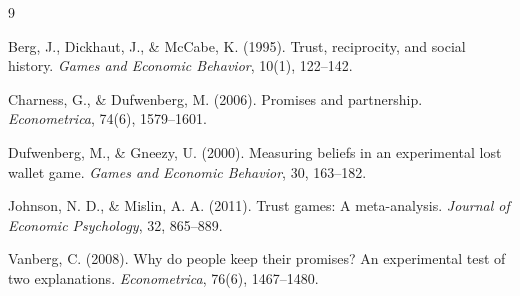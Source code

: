 \documentclass[10pt,a4paper]{ctexart}
\begin{document}
\begin{thebibliography}{9}\footnotesize
\setlength{\itemsep}{0pt}

Berg, J., Dickhaut, J., \& McCabe, K. (1995). Trust, reciprocity, and social history.
\textit{Games and Economic Behavior}, 10(1), 122--142.

Charness, G., \& Dufwenberg, M. (2006). Promises and partnership.
\textit{Econometrica}, 74(6), 1579--1601.

Dufwenberg, M., \& Gneezy, U. (2000). Measuring beliefs in an experimental lost wallet game.
\textit{Games and Economic Behavior}, 30, 163--182.

Johnson, N. D., \& Mislin, A. A. (2011). Trust games: A meta-analysis.
\textit{Journal of Economic Psychology}, 32, 865--889.

Vanberg, C. (2008). Why do people keep their promises? An experimental test of two explanations.
\textit{Econometrica}, 76(6), 1467--1480.

\end{thebibliography}
\end{document}

